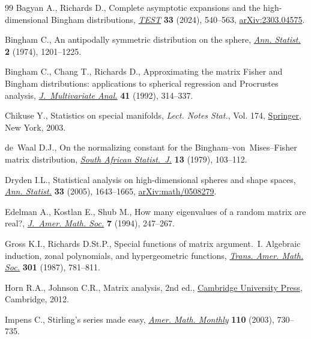 \documentclass[11pt]{article}
\numberwithin{equation}{section}
\numberwithin{equation}{section}
\begin{document}
\begin{thebibliography}{99}
Bagyan A., Richards D., Complete asymptotic expansions and the high-dimensional
 {B}ingham distributions, \href{https://doi.org/10.1007/s11749-023-00910-w}{\textit{TEST}} \textbf{33} (2024), 540--563,
 \href{https://arxiv.org/abs/2303.04575}{arXiv:2303.04575}.

Bingham C., An antipodally symmetric distribution on the sphere, \href{https://doi.org/10.1214/aos/1176342874}{\textit{Ann.
 Statist.}} \textbf{2} (1974), 1201--1225.

Bingham C., Chang T., Richards D., Approximating the matrix {F}isher and
 {B}ingham distributions: applications to spherical regression and
 {P}rocrustes analysis, \href{https://doi.org/10.1016/0047-259X(92)90072-N}{\textit{J.~Multivariate Anal.}} \textbf{41} (1992),
 314--337.

Chikuse Y., Statistics on special manifolds, \textit{Lect. Notes Stat.}, Vol.
 174, \href{https://doi.org/10.1007/978-0-387-21540-2}{Springer}, New York, 2003.

de~Waal D.J., On the normalizing constant for the
 {B}ingham--von~{M}ises--{F}isher matrix distribution, \href{https://doi.org/10520/AJA0038271X_687}{\textit{South African
 Statist.~J.}} \textbf{13} (1979), 103--112.

Dryden I.L., Statistical analysis on high-dimensional spheres and shape spaces,
 \href{https://doi.org/10.1214/009053605000000264}{\textit{Ann. Statist.}} \textbf{33} (2005), 1643--1665, \href{https://arxiv.org/abs/math/0508279}{arXiv:math/0508279}.

Edelman A., Kostlan E., Shub M., How many eigenvalues of a random matrix are
 real?, \href{https://doi.org/10.2307/2152729}{\textit{J.~Amer. Math. Soc.}} \textbf{7} (1994), 247--267.

Gross K.I., Richards D.St.P., Special functions of matrix argument.~{I}.
 {A}lgebraic induction, zonal polynomials, and hypergeometric functions,
 \href{https://doi.org/10.2307/2000670}{\textit{Trans. Amer. Math. Soc.}} \textbf{301} (1987), 781--811.

Horn R.A., Johnson C.R., Matrix analysis, 2nd ed., \href{https://doi.org/10.1017/CBO9781139020411}{Cambridge University Press},
 Cambridge, 2012.

Impens C., Stirling's series made easy, \href{https://doi.org/10.2307/3647856}{\textit{Amer. Math. Monthly}}
 \textbf{110} (2003), 730--735.


\end{thebibliography}
\end{document}
